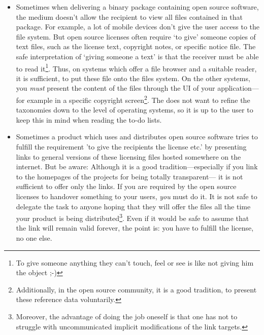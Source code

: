 \label{DistributingFilesHint}
\begin{itemize}
  \item
  Sometimes when delivering a binary package containing open source software,
  the medium doesn’t allow the recipient to view all files contained in that
  package. For example, a lot of mobile devices don’t give the user access to
  the file system. But open source licenses often require ‘to give’ someone
  copies of text files, such as the license text, copyright notes, or specific
  notice file. The safe interpretation of ‘giving someone a text’ is that the
  receiver must be able to read it\footnote{To give someone anything they can't
  touch, feel or see is like not giving him the object ;-)}. Thus, on
  systems which offer a file browser and a suitable reader, it is sufficient, to
  put these file onto the files system. On the other systems, you \emph{must}
  present the content of the files  through the UI of your application---for
  example in a specific copyright screen\footnote{Additionally, in the open
  source community, it is a good tradition, to present these reference data
  voluntarily.}. The \oslic{} does not want to refine the taxonomies down to the
  level of operating systems, so it is up to the user to keep this in mind when
  reading the to-do lists.
  
  \item Sometimes a product which uses and distributes open source software
  tries to fulfill the requirement 'to give the recipients the license etc.' by
  presenting links to general versions of these licensing files hosted somewhere
  on the internet. But be aware: Although it is a good tradition---especially
  if you link to the homepages of the projects for being totally transparent---
  it is not sufficient to offer only the links. If you are required by the open
  source licenses to handover something to your users, \emph{you} must do it. It
  is not safe to delegate the task to anyone hoping that they will offer the
  files all the time your product is being distributed\footnote{Moreover, the
  advantage of doing the job oneself is that one has not to struggle with
  uncommunicated implicit modifications of the link targets.}. Even if it would
  be safe to assume that the link will remain valid forever, the point is: you
  have to fulfill the license, no one else.
\end{itemize}

\label{OSUCToDoLists}


